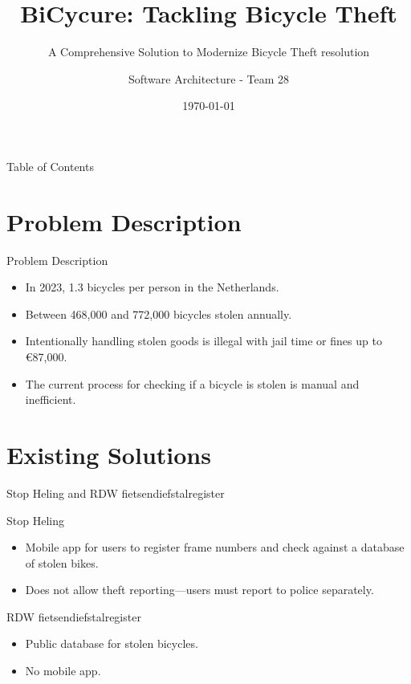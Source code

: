 \documentclass{beamer}
\title{BiCycure: Tackling Bicycle Theft}
\subtitle{A Comprehensive Solution to Modernize Bicycle Theft resolution}
\author{Software Architecture - Team  28}
\institute{TU Delft}
\date{\today}
\begin{document}
\begin{frame}
    \titlepage
\end{frame}

\begin{frame}{Table of Contents}
    \tableofcontents
\end{frame}

\section{Problem Description}
\begin{frame}{Problem Description}
    \begin{itemize}
        \item In 2023, 1.3 bicycles per person in the Netherlands.
        \item Between 468,000 and 772,000 bicycles stolen annually.
        \item Intentionally handling stolen goods is illegal with jail time or fines up to €87,000.
        \item The current process for checking if a bicycle is stolen is manual and inefficient.
    \end{itemize}
\end{frame}

\section{Existing Solutions}
\begin{frame}{Stop Heling and RDW fietsendiefstalregister}
    \begin{block}{Stop Heling}
        \begin{itemize}
            \item Mobile app for users to register frame numbers and check against a database of stolen bikes.
            \item Does not allow theft reporting—users must report to police separately.
        \end{itemize}
    \end{block}
    
    \begin{block}{RDW fietsendiefstalregister}
        \begin{itemize}
            \item Public database for stolen bicycles.
            \item No mobile app.
        \end{itemize}
    \end{block}
\end{frame}
\end{document}
